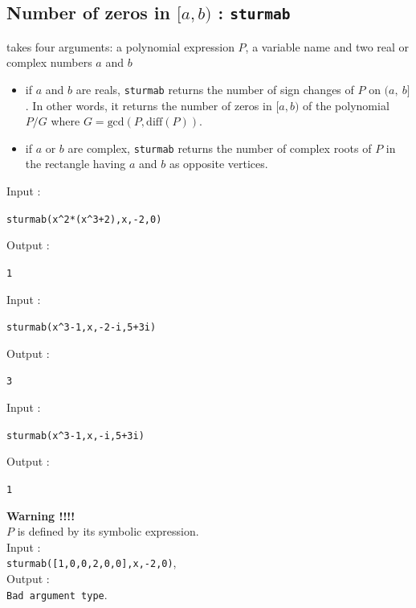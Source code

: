 \documentclass[a4paper,11pt]{book}
\begin{document}
\subsection{Number of zeros in $[a,b)$ : {\tt sturmab}}
 takes four arguments: a polynomial expression $P$, a 
variable name and two real or complex numbers $a$ and $b$
\begin{itemize}
\item if $a$ and $b$ are reals, 
{\tt sturmab} returns the number of sign changes of $P$ on $(a,\ b]$.
In other words, it returns the number of zeros in $[a,b)$ of the 
polynomial $P/G$ where $G=\mbox{gcd}(P,\mbox{diff}(P))$.
\item if $a$ or $b$ are complex, 
{\tt sturmab} returns the number of complex roots of $P$ in the rectangle 
having $a$ and $b$ as opposite vertices.
\end{itemize} 
Input :
\begin{center}{\tt sturmab(x\verb|^|2*(x\verb|^|3+2),x,-2,0)}\end{center}
Output :
\begin{center}{\tt 1}\end{center}
Input :
\begin{center}{\tt sturmab(x\verb|^|3-1,x,-2-i,5+3i)}\end{center}
Output :
\begin{center}{\tt 3}\end{center}
Input :
\begin{center}{\tt sturmab(x\verb|^|3-1,x,-i,5+3i)}\end{center}
Output :
\begin{center}{\tt 1}\end{center}
{\bf Warning !!!!}\\
 $P$ is defined by its symbolic expression.\\
Input  :\\
{\tt sturmab([1,0,0,2,0,0],x,-2,0)},\\ 
Output :\\
{\tt Bad argument type}.
\end{document}
